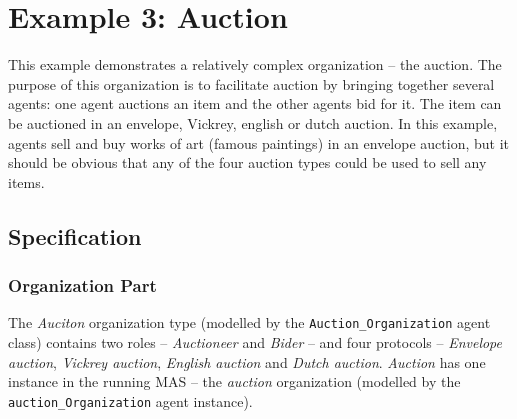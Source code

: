 
\section{Example 3: Auction}

This example demonstrates a relatively complex organization -- the auction.
The purpose of this organization is to facilitate auction by bringing together several agents: one agent auctions an item and the other agents bid for it.
The item can be auctioned in an envelope, Vickrey, english or dutch auction.
In this example, agents sell and buy works of art (famous paintings) in an envelope auction, but it should be obvious that any of the four auction types could be used to sell any items.

\subsection*{Specification}

\subsubsection*{Organization Part}

The \textit{Auciton} organization type (modelled by the \texttt{Auction\_Organization} agent class) contains two roles -- \textit{Auctioneer} and \textit{Bider} -- and four protocols -- \textit{Envelope auction}, \textit{Vickrey auction}, \textit{English auction} and \textit{Dutch auction}.
\textit{Auction} has one instance in the running MAS -- the \textit{auction} organization (modelled by the \texttt{auction\_Organization} agent instance).

